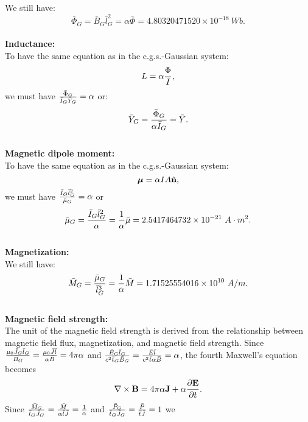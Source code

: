\documentclass[12pt,a4paper]{article}
\def\barwbg{4.80320471520\times 10^{-18}}
\def\barmug{2.5417464732\times 10^{-21}}
\def\barmagg{1.71525554016\times 10^{10}}
\begin{document}
{
We still have:
\begin{equation}
\bar \Phi_G=\bar B_G \bar l_G^2=\alpha \bar \Phi=\barwbg\ Wb.
\end{equation}\\
{\bf Inductance:\\}
To have the same equation as in the c.g.s.-Gaussian system:
\begin{equation}
L=\alpha {\Phi \over I},
\end{equation} 
we must have ${\bar \Phi_G \over \bar I_G \bar Y_G} = \alpha$ or: 
\begin{equation}
\bar Y_G={\bar \Phi_G \over \alpha \bar I_G}=\bar Y.
\end{equation}\\
{\bf Magnetic dipole moment:\\}
To have the same equation as in the c.g.s.-Gaussian system:
\begin{equation}
{\boldsymbol \mu}=\alpha I A \hat {\bf n},
\label{magdipaucgs}
\end{equation}
we must have ${\bar I_G \bar l_G^2 \over \bar \mu_G}=\alpha$ or
\begin{equation}
\bar \mu_G={\bar I_G \bar l_G^2 \over \alpha} ={1 \over \alpha} \bar \mu= 
\barmug\ A\cdot m^2.
\end{equation}\\
{\bf Magnetization:\\}
We still have:
\begin{equation}
\bar M_G={\bar \mu_G \over \bar l_G^3}={1\over \alpha} \bar M=
\barmagg\ A/m.
\end{equation}\\
{\bf Magnetic field strength:\\}
The unit of the magnetic field strength is derived from the relationship
between magnetic field flux, magnetization, and magnetic field strength.
Since ${\mu_0 \bar J_G \bar l_G \over \bar B_G}=
{\mu_0 \bar J \bar l \over \alpha \bar B}=4\pi \alpha$ and
${\bar E_G \bar l_G \over c^2 \bar t_G \bar B_G}=
{\bar E \bar l \over c^2 \bar t \alpha \bar B}=\alpha$, 
the fourth Maxwell's equation becomes
\begin{equation}
\nabla \times {\bf B}= 4 \pi \alpha {\bf J} + \alpha
{\partial {\bf E} \over \partial t}.
\end{equation}
Since ${\bar M_G \over \bar l_G \bar J_G}=
{\bar M \over \alpha \bar l \bar J}={1\over \alpha}$ and 
${\bar P_G \over \bar t_G \bar J_G}={\bar P \over \bar t \bar J}=1$ we
}
\end{document}
